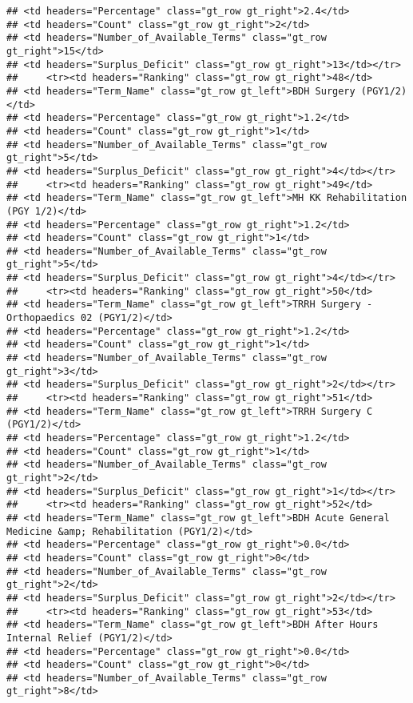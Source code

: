 \documentclass[
]{article}
\begin{document}
\begin{verbatim}
## <td headers="Percentage" class="gt_row gt_right">2.4</td>
## <td headers="Count" class="gt_row gt_right">2</td>
## <td headers="Number_of_Available_Terms" class="gt_row gt_right">15</td>
## <td headers="Surplus_Deficit" class="gt_row gt_right">13</td></tr>
##     <tr><td headers="Ranking" class="gt_row gt_right">48</td>
## <td headers="Term_Name" class="gt_row gt_left">BDH Surgery (PGY1/2)</td>
## <td headers="Percentage" class="gt_row gt_right">1.2</td>
## <td headers="Count" class="gt_row gt_right">1</td>
## <td headers="Number_of_Available_Terms" class="gt_row gt_right">5</td>
## <td headers="Surplus_Deficit" class="gt_row gt_right">4</td></tr>
##     <tr><td headers="Ranking" class="gt_row gt_right">49</td>
## <td headers="Term_Name" class="gt_row gt_left">MH KK Rehabilitation (PGY 1/2)</td>
## <td headers="Percentage" class="gt_row gt_right">1.2</td>
## <td headers="Count" class="gt_row gt_right">1</td>
## <td headers="Number_of_Available_Terms" class="gt_row gt_right">5</td>
## <td headers="Surplus_Deficit" class="gt_row gt_right">4</td></tr>
##     <tr><td headers="Ranking" class="gt_row gt_right">50</td>
## <td headers="Term_Name" class="gt_row gt_left">TRRH Surgery - Orthopaedics 02 (PGY1/2)</td>
## <td headers="Percentage" class="gt_row gt_right">1.2</td>
## <td headers="Count" class="gt_row gt_right">1</td>
## <td headers="Number_of_Available_Terms" class="gt_row gt_right">3</td>
## <td headers="Surplus_Deficit" class="gt_row gt_right">2</td></tr>
##     <tr><td headers="Ranking" class="gt_row gt_right">51</td>
## <td headers="Term_Name" class="gt_row gt_left">TRRH Surgery C (PGY1/2)</td>
## <td headers="Percentage" class="gt_row gt_right">1.2</td>
## <td headers="Count" class="gt_row gt_right">1</td>
## <td headers="Number_of_Available_Terms" class="gt_row gt_right">2</td>
## <td headers="Surplus_Deficit" class="gt_row gt_right">1</td></tr>
##     <tr><td headers="Ranking" class="gt_row gt_right">52</td>
## <td headers="Term_Name" class="gt_row gt_left">BDH Acute General Medicine &amp; Rehabilitation (PGY1/2)</td>
## <td headers="Percentage" class="gt_row gt_right">0.0</td>
## <td headers="Count" class="gt_row gt_right">0</td>
## <td headers="Number_of_Available_Terms" class="gt_row gt_right">2</td>
## <td headers="Surplus_Deficit" class="gt_row gt_right">2</td></tr>
##     <tr><td headers="Ranking" class="gt_row gt_right">53</td>
## <td headers="Term_Name" class="gt_row gt_left">BDH After Hours Internal Relief (PGY1/2)</td>
## <td headers="Percentage" class="gt_row gt_right">0.0</td>
## <td headers="Count" class="gt_row gt_right">0</td>
## <td headers="Number_of_Available_Terms" class="gt_row gt_right">8</td>

\end{verbatim}
\end{document}
